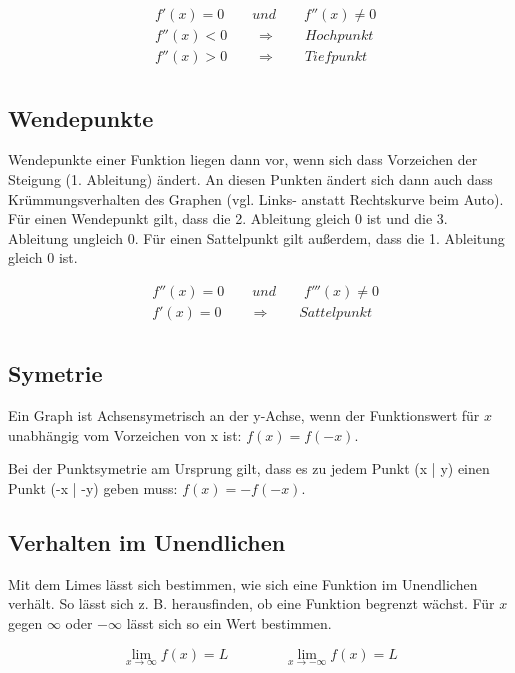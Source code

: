 \begin{align*}
    & f'(x) = 0 \qquad und \qquad f''(x) \neq 0 \\
    & f''(x) < 0 \qquad \Rightarrow \qquad Hochpunkt \\
    & f''(x) > 0 \qquad \Rightarrow \qquad Tiefpunkt \\
\end{align*}

\subsection{Wendepunkte}

Wendepunkte einer Funktion liegen dann vor, wenn sich dass Vorzeichen der Steigung (1. Ableitung)
ändert. An diesen Punkten ändert sich dann auch dass Krümmungsverhalten des Graphen
(vgl. Links- anstatt Rechtskurve beim Auto).
Für einen Wendepunkt gilt, dass die 2. Ableitung gleich 0 ist und die 3. Ableitung ungleich 0.
Für einen Sattelpunkt gilt außerdem, dass die 1. Ableitung gleich 0 ist.

\begin{align*}
    & f''(x) = 0 \qquad und \qquad f'''(x) \neq 0 \\
    & f'(x) = 0 \qquad \Rightarrow \qquad Sattelpunkt \\
\end{align*}

\subsection{Symetrie}

Ein Graph ist Achsensymetrisch an der y-Achse, wenn der Funktionswert für $x$ unabhängig vom
Vorzeichen von x ist: $f(x) = f(-x)$.

Bei der Punktsymetrie am Ursprung gilt, dass es zu jedem Punkt (x | y) einen Punkt (-x | -y)
geben muss: $f(x) = -f(-x)$.

\subsection{Verhalten im Unendlichen}

Mit dem Limes lässt sich bestimmen, wie sich eine Funktion im Unendlichen verhält.
So lässt sich z. B. herausfinden, ob eine Funktion begrenzt wächst.
Für $x$ gegen $\infty$ oder $-\infty$ lässt sich so ein Wert bestimmen.

\begin{equation*}
    \lim_{x \to \infty} f(x) = L \qquad \qquad \lim_{x \to -\infty} f(x) = L
\end{equation*}

